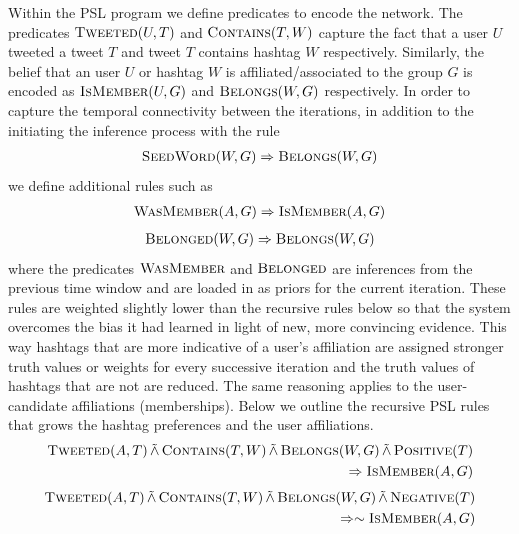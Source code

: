 Within the PSL program we define predicates to encode the network. 
The predicates $\textsc{Tweeted}(U,T)$ and $\textsc{Contains}(T,W)$  capture the fact that a user $U$ tweeted a tweet $T$ and tweet $T$ contains hashtag $W$ respectively. 
Similarly, the belief that an user $U$ or hashtag $W$ is affiliated/associated to the group $G$ is encoded as $\textsc{IsMember}(U,G)$ and $\textsc{Belongs}(W,G)$ respectively.
In order to capture the temporal connectivity between the iterations, in addition to the initiating the inference process with the rule
\begin{align*}
\textsc{SeedWord}(W,G) \Rightarrow \textsc{Belongs}(W,G)
\end{align*}
we define additional rules such as
\begin{align*}
\textsc{WasMember}(A,G) \Rightarrow \textsc{IsMember}(A,G)
\end{align*}
\begin{align*}
\textsc{Belonged}(W,G) \Rightarrow \textsc{Belongs}(W,G)
\end{align*}
where the predicates $\textsc{WasMember}$ and $\textsc{Belonged}$ are inferences from the previous time window and are loaded in as  priors for the current iteration.
These rules are weighted slightly lower than the recursive rules below so that the system overcomes the bias it had learned in light of new, more convincing evidence.
This way hashtags that are more indicative of a user's affiliation are assigned stronger truth values or weights for every successive iteration and the truth values of hashtags that are not are reduced.
The same reasoning applies to the user-candidate affiliations (memberships).
Below we outline the recursive PSL rules that grows the hashtag preferences and the user affiliations. 
\begin{align*}
\begin{split}
\textsc{Tweeted}(A,T) 
	\softand \textsc{Contains}(T,W)
	\softand \textsc{Belongs}(W,G)
	\softand \textsc{Positive}(T)\\
	\Rightarrow \textsc{IsMember}(A,G)
\end{split}
\end{align*}
\begin{align*}
\begin{split}
\textsc{Tweeted}(A,T)
	 \softand \textsc{Contains}(T,W)
	\softand \textsc{Belongs}(W,G)
	 \softand \textsc{Negative}(T)\\
	\Rightarrow \sim \textsc{IsMember}(A,G)
\end{split}
\end{align*}

